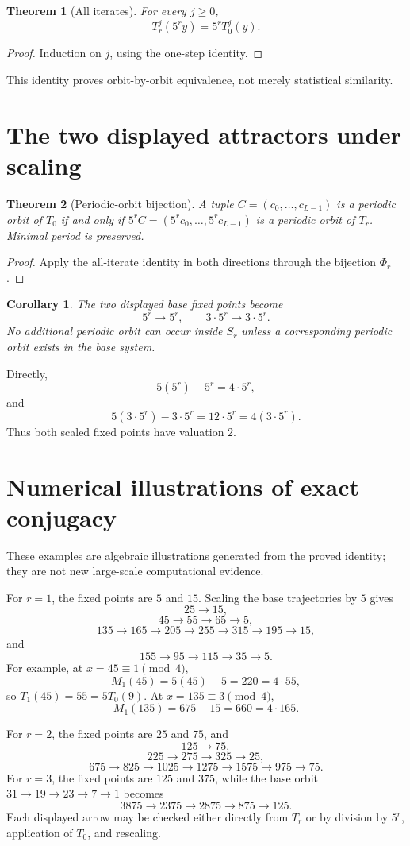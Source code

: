 \documentclass[11pt]{article}
\newtheorem{theorem}{Theorem}
\newtheorem{corollary}{Corollary}
\theoremstyle{remark}\newtheorem{remark}{Remark}
\begin{document}
\begin{theorem}[All iterates]
For every $j\ge0$,
\[
T_r^j(5^r y)=5^rT_0^j(y).
\]
\end{theorem}
\begin{proof}
Induction on $j$, using the one-step identity.
\end{proof}
This identity proves orbit-by-orbit equivalence, not merely statistical similarity.

\section{The two displayed attractors under scaling}
\begin{theorem}[Periodic-orbit bijection]
A tuple $C=(c_0,\ldots,c_{L-1})$ is a periodic orbit of $T_0$ if and only if
$5^rC=(5^rc_0,\ldots,5^rc_{L-1})$ is a periodic orbit of $T_r$. Minimal period is preserved.
\end{theorem}
\begin{proof}
Apply the all-iterate identity in both directions through the bijection $\Phi_r$.
\end{proof}
\begin{corollary}
The two displayed base fixed points become
\[
5^r\to5^r,\qquad3\cdot5^r\to3\cdot5^r.
\]
No additional periodic orbit can occur inside $S_r$ unless a corresponding periodic orbit exists in the base system.
\end{corollary}

Directly,
\[
5(5^r)-5^r=4\cdot5^r,
\]
and
\[
5(3\cdot5^r)-3\cdot5^r=12\cdot5^r=4(3\cdot5^r).
\]
Thus both scaled fixed points have valuation $2$.

\section{Numerical illustrations of exact conjugacy}
These examples are algebraic illustrations generated from the proved identity; they are not new large-scale computational evidence.

For $r=1$, the fixed points are $5$ and $15$. Scaling the base trajectories by $5$ gives
\[
25\to15,
\]
\[
45\to55\to65\to5,
\]
\[
135\to165\to205\to255\to315\to195\to15,
\]
and
\[
155\to95\to115\to35\to5.
\]
For example, at $x=45\equiv1\pmod4$,
\[
M_1(45)=5(45)-5=220=4\cdot55,
\]
so $T_1(45)=55=5T_0(9)$.  At $x=135\equiv3\pmod4$,
\[
M_1(135)=675-15=660=4\cdot165.
\]

For $r=2$, the fixed points are $25$ and $75$, and
\[
125\to75,
\]
\[
225\to275\to325\to25,
\]
\[
675\to825\to1025\to1275\to1575\to975\to75.
\]
For $r=3$, the fixed points are $125$ and $375$, while the base orbit $31\to19\to23\to7\to1$ becomes
\[
3875\to2375\to2875\to875\to125.
\]
Each displayed arrow may be checked either directly from $T_r$ or by division by $5^r$, application of $T_0$, and rescaling.
\end{document}
